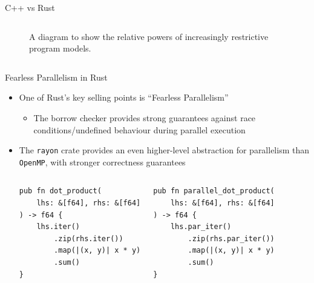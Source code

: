 \documentclass[10pt,aspectratio=169]{beamer}
\begin{document}
\begin{frame}{C++ vs Rust}
\begin{columns}[onlytextwidth]
\begin{figure}[H]
                \caption{A diagram to show the relative powers of increasingly restrictive program models.}
            \label{fig:warwick_mantevo_link}
        \end{figure}
    \end{columns}
\end{frame}


\begin{frame}[fragile]{Fearless Parallelism in Rust}
    \begin{itemize}
        \item<1-> One of Rust's key selling points is ``Fearless Parallelism''
        \begin{itemize}
            \item The borrow checker provides strong guarantees against race conditions/undefined behaviour during parallel execution
        \end{itemize}
        \vspace*{0.5cm}
        \item<2-> The \texttt{rayon} crate provides an even higher-level abstraction for parallelism than \texttt{OpenMP}, with stronger correctness guarantees
        \begin{columns}[T,onlytextwidth]
            \centering
                \begin{verbatim}
pub fn dot_product(
    lhs: &[f64], rhs: &[f64]
) -> f64 {
    lhs.iter()
        .zip(rhs.iter())
        .map(|(x, y)| x * y)
        .sum()
}
                \end{verbatim}
                \begin{verbatim}
pub fn parallel_dot_product(
    lhs: &[f64], rhs: &[f64]
) -> f64 {
    lhs.par_iter()
        .zip(rhs.par_iter())
        .map(|(x, y)| x * y)
        .sum()
}
                \end{verbatim}
        \end{columns}
    \end{itemize}
\end{frame}
\end{document}
